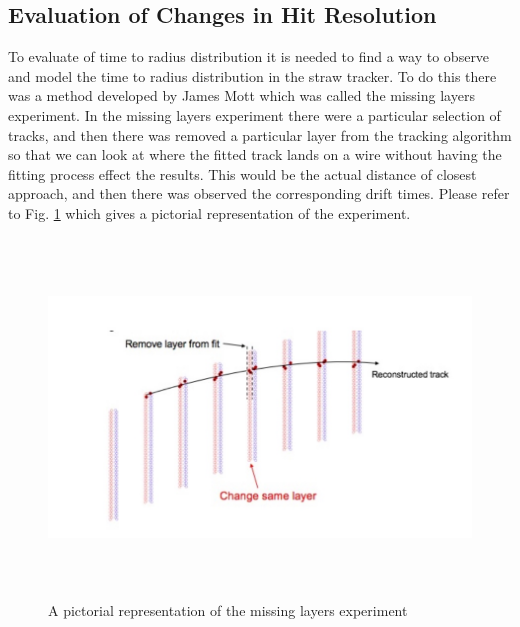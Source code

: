 \documentclass[./Thesis]{subfiles}
\begin{document}
\subsection{Evaluation of Changes in Hit Resolution}

To evaluate of time to radius distribution it is needed to find a way to observe and model the time to radius distribution in the straw tracker. To do this there was a method developed by James Mott \cite{jMottmiss} which was called the missing layers experiment. In the missing layers experiment there were a  particular selection of tracks, and then there was removed a particular layer from the tracking algorithm so that we can look at where the fitted track lands on a wire without having the fitting process effect the results. This would be the actual distance of closest approach, and then there was observed the corresponding drift times. Please refer to Fig. \ref{fig:Missing Layers} which gives a pictorial representation of the experiment.

\begin{figure}
	\centerline{\includegraphics[height=95mm]{MissingLayers.jpeg}}
	\caption[Missing Layers]{ A pictorial representation of the missing layers experiment}
	\label{fig:Missing Layers}
\end{figure}
\end{document}
